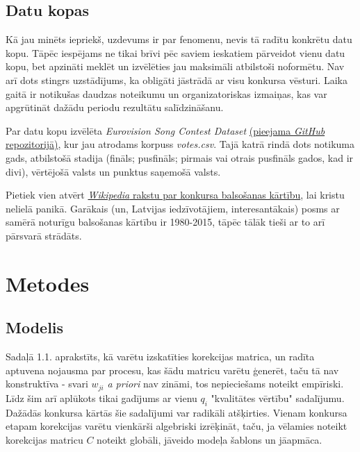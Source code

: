 \documentclass[12pt, a4paper]{article}
\begin{document}
\subsection{Datu kopas}

Kā jau minēts iepriekš, uzdevums ir par fenomenu, nevis tā radītu konkrētu datu kopu. Tāpēc iespējams ne tikai brīvi pēc saviem ieskatiem pārveidot vienu datu kopu, bet apzināti meklēt un izvēlēties jau maksimāli atbilstoši noformētu. Nav arī dots stingrs uzstādījums, ka obligāti jāstrādā ar visu konkursa vēsturi. Laika gaitā ir notikušas daudzas noteikumu un organizatoriskas izmaiņas, kas var apgrūtināt dažādu periodu rezultātu salīdzināšanu.

Par datu kopu izvēlēta \textit{Eurovision Song Contest Dataset} \href{https://github.com/Spijkervet/eurovision-dataset}{(pieejama \textit{GitHub} repozitorijā)}, kur jau atrodams korpuss \textit{votes.csv}. Tajā katrā rindā dots notikuma gads, atbilstošā stadija (fināls; pusfināls; pirmais vai otrais pusfināls gados, kad ir divi), vērtējošā valsts un punktus saņemošā valsts. 

Pietiek vien atvērt \href{https://en.wikipedia.org/wiki/Voting_at_the_Eurovision_Song_Contest}{\textit{Wikipedia} rakstu par konkursa balsošanas kārtību}, lai kristu nelielā panikā. Garākais (un, Latvijas iedzīvotājiem, interesantākais) posms ar samērā noturīgu balsošanas kārtību ir 1980-2015, tāpēc tālāk tieši ar to arī pārsvarā strādāts.

\newpage
\section{Metodes}

\subsection{Modelis}

Sadaļā 1.1. aprakstīts, kā varētu izskatīties korekcijas matrica, un radīta aptuvena nojausma par procesu, kas šādu matricu varētu ģenerēt, taču tā nav konstruktīva - svari $w_{ji}$ \textit{a priori} nav zināmi, tos nepieciešams noteikt empīriski. Līdz šim arī aplūkots tikai gadījums ar vienu $q_i$ "kvalitātes vērtību" sadalījumu. Dažādās konkursa kārtās šie sadalījumi var radikāli atšķirties. Vienam konkursa etapam korekcijas varētu vienkārši algebriski izrēķināt, taču, ja vēlamies noteikt korekcijas matricu $C$ noteikt globāli, jāveido modeļa šablons un jāapmāca.
\end{document}
